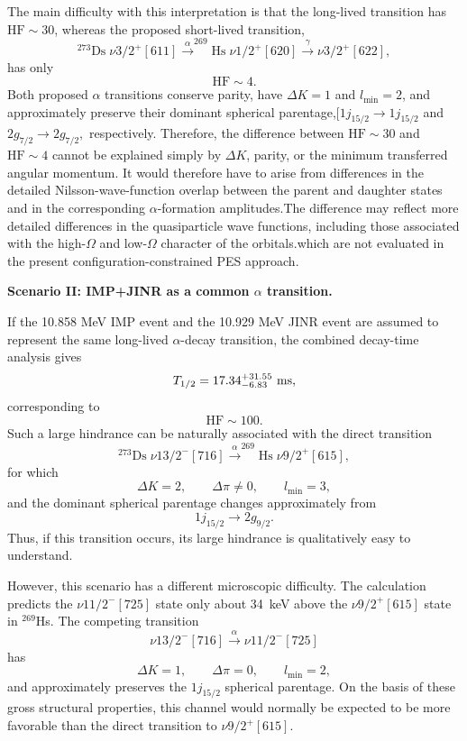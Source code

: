 \documentclass[11pt]{article}
\begin{document}
\begin{enumerate}
The main difficulty with this interpretation is that the long-lived
transition has $\mathrm{HF}\sim30$, whereas the proposed short-lived
transition,
\[
^{273}\mathrm{Ds}\;
\nu 3/2^{+}[611]
\xrightarrow{\alpha}
^{269}\mathrm{Hs}\;
\nu 1/2^{+}[620]
\xrightarrow{\gamma}
\nu 3/2^{+}[622],
\]
has only
\[
\mathrm{HF}\sim4 .
\]
Both proposed $\alpha$ transitions conserve parity, have
$\Delta K=1$ and $l_{\min}=2$, and approximately preserve their
dominant spherical parentage,$[1j_{15/2}\rightarrow1j_{15/2}$
and $2g_{7/2}\rightarrow2g_{7/2},$
respectively.
Therefore, the difference between $\mathrm{HF}\sim30$ and
$\mathrm{HF}\sim4$ cannot be explained simply by $\Delta K$, parity,
or the minimum transferred angular momentum.
It would therefore have to arise from differences in the detailed
Nilsson-wave-function overlap between the parent and daughter states
and in the corresponding $\alpha$-formation amplitudes.The difference may reflect more detailed differences in the quasiparticle wave functions, 
including those associated with the high-$\Omega$ and low-$\Omega$ character of the orbitals.which are not
evaluated in the present configuration-constrained PES approach.

\medskip

\textbf{Scenario II: IMP+JINR as a common $\alpha$ transition.}

If the 10.858 MeV IMP event and the 10.929 MeV JINR event are assumed
to represent the same long-lived $\alpha$-decay transition, the combined
decay-time analysis gives
\[
T_{1/2}=17.34^{+31.55}_{-6.83}\ {\rm ms},
\]
corresponding to
\[
\mathrm{HF}\sim100 .
\]
Such a large hindrance can be naturally associated with the direct
transition
\[
^{273}\mathrm{Ds}\;
\nu 13/2^{-}[716]
\xrightarrow{\alpha}
^{269}\mathrm{Hs}\;
\nu 9/2^{+}[615],
\]
for which
\[
\Delta K=2,
\qquad
\Delta\pi\neq0,
\qquad
l_{\min}=3,
\]
and the dominant spherical parentage changes approximately from
\[
1j_{15/2}\rightarrow2g_{9/2}.
\]
Thus, if this transition occurs, its large hindrance is qualitatively
easy to understand.

However, this scenario has a different microscopic difficulty.
The calculation predicts the
$\nu 11/2^{-}[725]$ state only about 34~keV above the
$\nu 9/2^{+}[615]$ state in $^{269}$Hs.
The competing transition
\[
\nu 13/2^{-}[716]
\xrightarrow{\alpha}
\nu 11/2^{-}[725]
\]
has
\[
\Delta K=1,\qquad
\Delta\pi=0,\qquad
l_{\min}=2,
\]
and approximately preserves the $1j_{15/2}$ spherical parentage.
On the basis of these gross structural properties, this channel would
normally be expected to be more favorable than the direct transition
to $\nu 9/2^{+}[615]$.


\end{enumerate}
\end{document}
